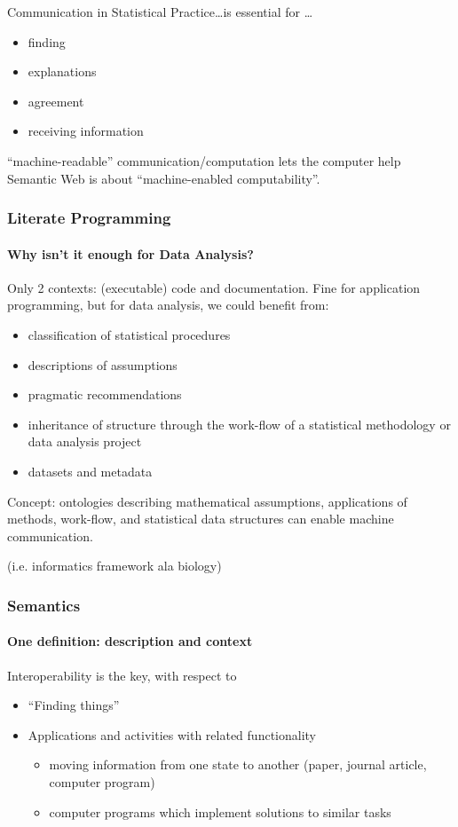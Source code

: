 \documentclass{beamer}
\begin{document}
\begin{frame}{Communication in Statistical Practice}{\ldots is essential for \ldots}
  \begin{itemize}
  \item finding
  \item explanations
  \item agreement
  \item receiving information
  \end{itemize}
  \alert{``machine-readable'' communication/computation lets the
    computer help} \\
  Semantic Web is about ``machine-enabled computability''.
\end{frame}

\begin{frame}
  \frametitle{Literate Programming}
  \framesubtitle{Why isn't it enough for Data Analysis?}

  Only 2 contexts: (executable) code and documentation.  Fine for
  application programming,  but for data analysis, we could benefit
  from:
  \begin{itemize}
  \item classification of statistical procedures
  \item descriptions of assumptions
  \item pragmatic recommendations
  \item inheritance of structure through the work-flow of a
    statistical methodology or data analysis project
  \item datasets and metadata
  \end{itemize}
  Concept: ontologies describing mathematical assumptions, applications
  of methods, work-flow, and statistical data structures can enable
  machine communication.
  
  (i.e. informatics framework ala biology)
\end{frame}

\begin{frame}  \frametitle{Semantics}
  \framesubtitle{One definition: description and context}

  Interoperability is the key, with respect to
  \begin{itemize}
  \item ``Finding things''
  \item Applications and activities with related functionality
    \begin{itemize}
    \item moving information from one state to another (paper, journal
      article, computer program)
    \item computer programs which implement solutions to similar tasks
    \end{itemize}
  \end{itemize}
\end{frame}
\end{document}
